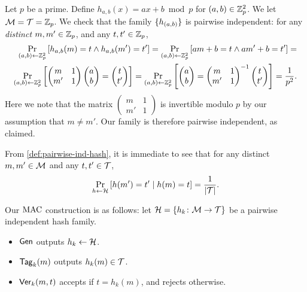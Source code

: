 \documentclass[11pt]{article}
\begin{document}
\begin{example} 
  \label{ex:pairwise-ind}
  Let $p$ be a prime.  Define $h_{a,b}(x) = ax + b \bmod p$ for $(a,b)
  \in \mathbb{Z}_p^2$.  We let $\mathcal{M} = \mathcal{T} = \mathbb{Z}_p$.  We check that
  the family $\{h_{(a,b)}\}$ is pairwise independent: for any
  \emph{distinct} $m,m' \in \mathbb{Z}_p$, and any $t,t' \in \mathbb{Z}_p$,
  \begin{align*}
    \Pr_{(a,b) \gets \mathbb{Z}_p^2}\left[h_{a,b}(m) = t \wedge h_{a,b}(m') =
      t'\right] =
    \Pr_{(a,b) \gets \mathbb{Z}_p^2}\left[am+b = t \wedge am'+b = t'\right] = \\
    \Pr_{(a,b) \gets \mathbb{Z}_p^2}\left[
      \begin{pmatrix} m & 1 \\ m ' & 1 \end{pmatrix}
      \begin{pmatrix} a \\ b \end{pmatrix} =
      \begin{pmatrix} t \\ t' \end{pmatrix} \right] = \Pr_{(a,b) \gets
      \mathbb{Z}_p^2}\left[ \begin{pmatrix} a \\ b \end{pmatrix} =
      \begin{pmatrix} m & 1 \\ m ' & 1 \end{pmatrix}^{-1}
      \begin{pmatrix} t \\ t' \end{pmatrix} \right] = \frac{1}{p^2}.
  \end{align*}
  Here we note that the matrix $\left( \begin{smallmatrix} m & 1 \\ m
      ' & 1 \end{smallmatrix} \right)$ is invertible modulo $p$ by our
  assumption that $m \neq m'$.  Our family is therefore pairwise
  independent, as claimed.
\end{example}

From \cref{def:pairwise-ind-hash}, it is immediate to see
that for any distinct $m,m' \in \mathcal{M}$ and any $t,t' \in
\mathcal{T}$, \[ \Pr_{h \gets \mathcal{H}}\left[h(m')=t' \mid h(m)=t\right] =
\frac{1}{\lvert\mathcal{T}\rvert}. \]

\noindent
Our $\text{MAC}$ construction is as follows: let $\mathcal{H} = \{h_k \colon
  \mathcal{M} \to \mathcal{T}\}$ be a pairwise independent hash family.
\begin{itemize}
\item $\mathsf{Gen}$ outputs $h_{k} \gets \mathcal{H}$.
\item $\mathsf{Tag}_k(m)$ outputs $h_{k}(m) \in \mathcal{T}$.
\item $\mathsf{Ver}_k(m, t)$ accepts if $t = h_k(m)$, and rejects otherwise.
\end{itemize}
\end{document}
